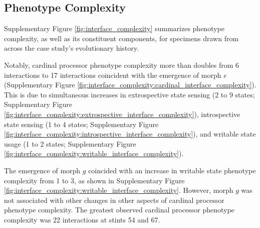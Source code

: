 


\subsection{Phenotype Complexity}

Supplementary Figure \ref{fig:interface_complexity} summarizes phenotype complexity, as well as its constituent components, for specimens drawn from across the case study's evolutionary history.

Notably, cardinal processor phenotype complexity more than doubles from 6 interactions to 17 interactions coincident with the emergence of morph $e$ (Supplementary Figure \ref{fig:interface_complexity:cardinal_interface_complexity}).
This is due to simultaneous increases in extrospective state sensing (2 to 9 states; Supplementary Figure \ref{fig:interface_complexity:extrospective_interface_complexity}), introspective state sensing (1 to 4 states; Supplementary Figure \ref{fig:interface_complexity:introspective_interface_complexity}), and writable state usage (1 to 2 states; Supplementary Figure \ref{fig:interface_complexity:writable_interface_complexity}).

The emergence of morph $g$ coincided with an increase in writable state phenotype complexity from 1 to 3, as shown in Supplementary Figure \ref{fig:interface_complexity:writable_interface_complexity}.
However, morph $g$ was not associated with other changes in other aspects of cardinal processor phenotype complexity.
The greatest observed cardinal processor phenotype complexity was 22 interactions at stints 54 and 67.

